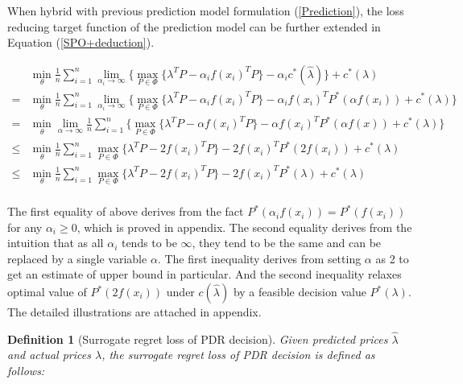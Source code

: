 \documentclass[journal]{IEEEtran}
\newtheorem{definition}{Definition}
\begin{document}
When hybrid with previous prediction model formulation (\ref{Prediction}), the loss reducing target function of the prediction model can be further extended in Equation (\ref{SPO+deduction}).
\begin{figure*}[!t]
  \begin{equation}
    \label{SPO+deduction}
    \begin{aligned}
      &\min_{\theta} \frac{1}{n} \sum_{i=1}^n \lim_{\alpha_i \to \infty } \Big\{ \max_{P \in \Phi} \{\lambda^T P - \alpha_i f(x_i)^T P \} - \alpha_i c^*(\hat{\lambda}) \Big\}  + c^*(\lambda) \\
      = & \min_{\theta} \frac{1}{n} \sum_{i=1}^n \lim_{\alpha_i \to \infty } \Big\{ \max_{P \in \Phi} \{\lambda^T P - \alpha_i f(x_i)^T P \} - \alpha_i f(x_i)^T P^*(\alpha f(x_i))  + c^*(\lambda) \Big\} \\
      = & \min_{\theta}  \lim_{\alpha \to \infty } \frac{1}{n} \sum_{i=1}^n \Big\{ \max_{P \in \Phi} \{\lambda^T P - \alpha f(x_i)^T P \} - \alpha f(x_i)^T P^*(\alpha f(x))  + c^*(\lambda) \Big\} \\
      \leq & \min_{\theta} \frac{1}{n} \sum_{i=1}^n   \max_{P \in \Phi} \Big\{\lambda^T P - 2 f(x_i)^T P \Big\} - 2 f(x_i)^T P^*(2 f(x_i)) + c^*(\lambda)\\
      \leq & \min_{\theta} \frac{1}{n} \sum_{i=1}^n   \max_{P \in \Phi} \Big\{\lambda^T P - 2 f(x_i)^T P \Big\} - 2 f(x_i)^T P^*(\lambda) + c^*(\lambda) \\ 
    \end{aligned}
  \end{equation}
\end{figure*}
The first equality of above derives from the fact $P^*(\alpha_i f(x_i)) = P^*(f(x_i))$ for any $\alpha_i \geq 0$, which is proved in appendix. The second equality derives from the intuition that as all $\alpha_i$ tends to be $\infty$, they tend to be the same and can be replaced by a single variable $\alpha$. The first inequality derives from setting $\alpha$ as 2 to get an estimate of upper bound in particular. And the second inequality relaxes optimal value of $P^*(2 f(x_i))$ under $c(\hat{\lambda})$  by a feasible decision value $P^*(\lambda)$. The detailed illustrations are attached in appendix.

\begin{definition}[Surrogate regret loss of PDR decision]
Given predicted prices $\hat{\lambda}$ and actual prices $\lambda$, the surrogate regret loss of PDR decision is defined as follows:
\end{definition}
\end{document}
